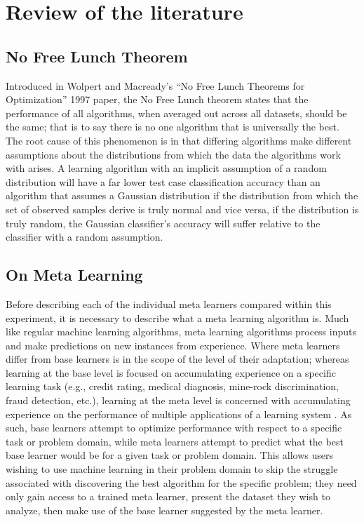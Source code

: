 \chapter{Review of the literature}
\label{Chapter2}
\section{No Free Lunch Theorem}
Introduced in Wolpert and Macready's ``No Free Lunch Theorems for Optimization''
1997 paper, the No Free Lunch theorem states that the performance of all
algorithms, when averaged out across all datasets, should be the same; that is
to say there is no one algorithm that is universally the best. The root cause of
this phenomenon is in that differing algorithms make different assumptions
about the distributions from which the data the algorithms work with arises. A
learning algorithm with an implicit assumption of a random distribution will
have a far lower test case classification accuracy than an algorithm that
assumes a Gaussian distribution if the distribution from which the set of
observed samples derive is truly normal and vice versa, if the
distribution is truly random, the Gaussian classifier's accuracy will suffer
relative to the classifier with a random assumption.
\section{On Meta Learning}
Before describing each of the individual meta learners compared within this
experiment, it is necessary to describe what a meta learning algorithm is.
Much like regular machine learning algorithms, meta learning algorithms process
inputs and make predictions on new instances from experience. Where meta learners
differ from base learners is in the scope of the level of their adaptation; whereas
learning at the base level is focused on accumulating experience on a specific
learning task (e.g., credit rating, medical diagnosis, mine-rock discrimination,
fraud detection, etc.), learning at the meta level is concerned with accumulating
experience on the performance of multiple applications of a learning system
\cite{Vilalta}. As such, base learners attempt to optimize performance with
respect to a specific task or problem domain, while meta learners attempt to
predict what the best base learner would be for a given task or problem domain.
This allows users wishing to use machine learning in their problem domain to skip
the struggle associated with discovering the best algorithm for the specific
problem; they need only gain access to a trained meta learner, present the dataset
they wish to analyze, then make use of the base learner suggested by the meta
learner.

